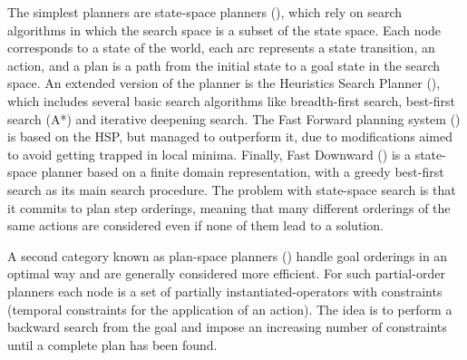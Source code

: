The simplest planners are state-space planners (\cite{ghallab2004automated}), which rely on search algorithms in which the search space is a subset of the state space. 
Each node corresponds to a state of the world, each arc represents a state transition, \ie an action, and a plan is a path from the initial state to a goal state in the search space. 
An extended version of the planner is the Heuristics Search Planner (\cite{bonet:01}), which includes several basic search algorithms like breadth-first search, best-first search (\eg A*) and iterative deepening search. 
The Fast Forward planning system (\cite{hoffmann2001ff}) is based on the HSP, but managed to outperform it, due to modifications aimed to avoid getting trapped in local minima. %
Finally, Fast Downward (\cite{helmert:06a}) is a state-space planner based on a finite domain representation, with a greedy best-first search as its main search procedure. 
The problem with state-space search is that it commits to plan step orderings, meaning that many different orderings of the same actions are considered even if none of them lead to a solution.

A second category known as plan-space planners (\cite{penberthy1992ucpop}) handle goal orderings in an optimal way and are generally considered more efficient. 
For such partial-order planners each node is a set of partially instantiated-operators with constraints (\eg temporal constraints for the application of an action).
The idea is to perform a backward search from the goal and impose an increasing number of constraints until a complete plan has been found.

